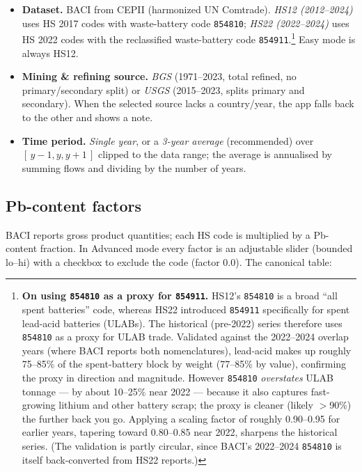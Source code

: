 \documentclass[11pt,a4paper]{article}
\newcommand{\hs}[1]{\texttt{#1}}
\begin{document}
\begin{itemize}[leftmargin=1.4em]
  \item \textbf{Dataset.} BACI from CEPII (harmonized UN Comtrade). \emph{HS12
        (2012--2024)} uses HS 2017 codes with waste-battery code \hs{854810};
        \emph{HS22 (2022--2024)} uses HS 2022 codes with the reclassified
        waste-battery code \hs{854911}.\footnote{\textbf{On using \texttt{854810}
        as a proxy for \texttt{854911}.} HS12's \texttt{854810} is a broad ``all
        spent batteries'' code, whereas HS22 introduced \texttt{854911}
        specifically for spent lead-acid batteries (ULABs). The historical
        (pre-2022) series therefore uses \texttt{854810} as a proxy for ULAB trade.
        Validated against the 2022--2024 overlap years (where BACI reports both
        nomenclatures), lead-acid makes up roughly 75--85\% of the spent-battery
        block by weight (77--85\% by value), confirming the proxy in direction and
        magnitude. However \texttt{854810} \emph{overstates} ULAB tonnage --- by
        about 10--25\% near 2022 --- because it also captures fast-growing lithium
        and other battery scrap; the proxy is cleaner (likely $>$90\%) the further
        back you go. Applying a scaling factor of roughly 0.90--0.95 for earlier
        years, tapering toward 0.80--0.85 near 2022, sharpens the historical series.
        (The validation is partly circular, since BACI's 2022--2024 \texttt{854810}
        is itself back-converted from HS22 reports.)} Easy mode is always HS12.
  \item \textbf{Mining \& refining source.} \emph{BGS} (1971--2023, total refined,
        no primary/secondary split) or \emph{USGS} (2015--2023, splits primary and
        secondary). When the selected source lacks a country/year, the app falls
        back to the other and shows a note.
  \item \textbf{Time period.} \emph{Single year}, or a \emph{3-year average}
        (recommended) over $[\,y-1,y,y+1\,]$ clipped to the data range; the
        average is annualised by summing flows and dividing by the number of years.
\end{itemize}

\subsection{Pb-content factors}\label{sec:pbfactors}

BACI reports gross product quantities; each HS code is multiplied by a Pb-content
fraction. In Advanced mode every factor is an adjustable slider (bounded lo--hi)
with a checkbox to exclude the code (factor $0.0$). The canonical table:
\end{document}
